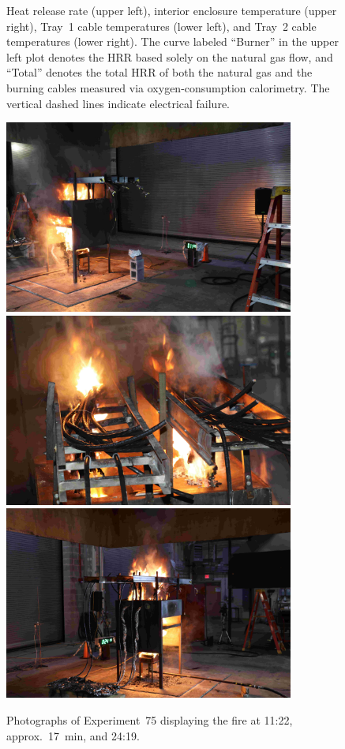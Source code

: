 \begin{figure}[H]
\caption[HRR and temperatures of Experiment 75]{Heat release rate (upper left), interior enclosure temperature (upper right), Tray~1 cable temperatures (lower left), and Tray~2 cable temperatures (lower right). The curve labeled ``Burner'' in the upper left plot denotes the HRR based solely on the natural gas flow, and ``Total'' denotes the total HRR of both the natural gas and the burning cables measured via oxygen-consumption calorimetry. The vertical dashed lines indicate electrical failure.}
\label{fig:Test_75}
\end{figure}

\begin{figure}[p]
\centering
\includegraphics[height=2.50in]{../FIGURES/Test_75_Photo_1} \\ \vspace{0.1in}
\includegraphics[height=2.50in]{../FIGURES/Test_75_Photo_2} \\ \vspace{0.1in}
\includegraphics[height=2.50in]{../FIGURES/Test_75_Photo_3}
\caption[Photographs of Experiment~75]{Photographs of Experiment~75 displaying the fire at 11:22, approx.~17~min, and 24:19.}
\label{fig:Test_75_photos}
\end{figure}


